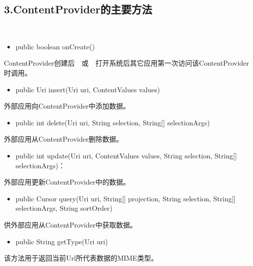 \documentclass[9pt, b5paper]{article}
\begin{document}
\subsection{3.ContentProvider的主要方法}
\label{sec-14-3}
　
\begin{itemize}
\item public boolean onCreate()
\end{itemize}
ContentProvider创建后　或　打开系统后其它应用第一次访问该ContentProvider时调用。
\begin{itemize}
\item public Uri insert(Uri uri, ContentValues values)
\end{itemize}
外部应用向ContentProvider中添加数据。
\begin{itemize}
\item public int delete(Uri uri, String selection, String[] selectionArgs)
\end{itemize}
外部应用从ContentProvider删除数据。
\begin{itemize}
\item public int update(Uri uri, ContentValues values, String selection, String[] selectionArgs)：
\end{itemize}
外部应用更新ContentProvider中的数据。
\begin{itemize}
\item public Cursor query(Uri uri, String[] projection, String selection, String[] selectionArgs, String sortOrder)　
\end{itemize}
供外部应用从ContentProvider中获取数据。
　
\begin{itemize}
\item public String getType(Uri uri)
\end{itemize}
该方法用于返回当前Url所代表数据的MIME类型。
\end{document}

